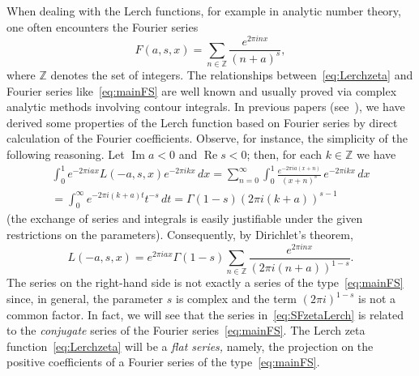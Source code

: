 \documentclass[11pt,a4paper,reqno]{amsart}
\newcommand{\Z}{\mathbb{Z}}
\renewcommand{\Re}{\operatorname{Re}}
\renewcommand{\Im}{\operatorname{Im}}
\theoremstyle{plain}
\theoremstyle{remark}
\numberwithin{equation}{section}
\begin{document}
When dealing with the Lerch functions, for example in analytic number theory, one often encounters the Fourier series
\begin{equation}
\label{eq:mainFS}
  F(a,s,x) = \sum_{n\in\Z}\frac{e^{2\pi i nx}}{(n+a)^s},
\end{equation}
where $\Z$ denotes the set of integers.
The relationships between~\eqref{eq:Lerchzeta} and Fourier series like~\eqref{eq:mainFS} are well known and usually proved via complex analytic methods involving contour integrals. In previous papers (see~\cite{NRV-JAT2, NRV-MC2}), we have derived some properties of the Lerch function based on Fourier series by direct calculation of the Fourier coefficients. Observe, for instance, the simplicity of the following reasoning. Let $\Im a<0$ and $\Re s<0$; then, for each $k\in\Z$ we have
\begin{multline*}
  \int_0^1 e^{-2\pi i a x} L(-a,s,x) e^{-2\pi i kx}\,dx
  = \sum_{n=0}^\infty \int_0^1 \frac{e^{-2\pi i a(x+n)}}{(x+n)^s} \,e^{-2\pi i kx}\,dx
  \\
  = \int_0^\infty e^{-2\pi i(k+a)t}t^{-s} \,dt
  = \Gamma(1-s)(2\pi i(k+a))^{s-1}
\end{multline*}
(the exchange of series and integrals is easily justifiable under the given restrictions on the parameters). Consequently, by Dirichlet's theorem,
\begin{equation}
\label{eq:SFzetaLerch}
  L(-a,s,x) = e^{2\pi iax} \Gamma(1-s) \sum_{n\in\Z} \frac{e^{2\pi inx}}{(2\pi i(n+a))^{1-s}}.
\end{equation}
The series on the right-hand side is not exactly a series of the type~\eqref{eq:mainFS} since, in general, the parameter $s$ is complex and the term $(2\pi i)^{1-s}$ is not a common factor. In fact, we will see that the series in~\eqref{eq:SFzetaLerch} is related to the \emph{conjugate} series of the Fourier series~\eqref{eq:mainFS}.
The Lerch zeta function~\eqref{eq:Lerchzeta} will be a \emph{flat series,} namely, the projection on the positive coefficients of a Fourier series of the type~\eqref{eq:mainFS}. 

\end{document}
